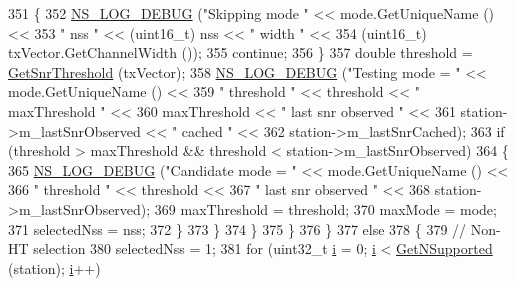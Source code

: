 \begin{DoxyCode}
351                         \{
352                           \hyperlink{group__logging_ga413f1886406d49f59a6a0a89b77b4d0a}{NS\_LOG\_DEBUG} (\textcolor{stringliteral}{"Skipping mode "} << mode.GetUniqueName () <<
353                                         \textcolor{stringliteral}{" nss "} << (uint16\_t) nss << \textcolor{stringliteral}{" width "} <<
354                                         (uint16\_t) txVector.GetChannelWidth ());
355                           \textcolor{keywordflow}{continue};
356                         \}
357                       \textcolor{keywordtype}{double} threshold = \hyperlink{classns3_1_1IdealWifiManager_a4712a1357ab7ba3f2aba5b183cd18f6a}{GetSnrThreshold} (txVector);
358                       \hyperlink{group__logging_ga413f1886406d49f59a6a0a89b77b4d0a}{NS\_LOG\_DEBUG} (\textcolor{stringliteral}{"Testing mode = "} << mode.GetUniqueName () <<
359                                     \textcolor{stringliteral}{" threshold "} << threshold  << \textcolor{stringliteral}{" maxThreshold "} <<
360                                     maxThreshold << \textcolor{stringliteral}{" last snr observed "} <<
361                                     station->m\_lastSnrObserved << \textcolor{stringliteral}{" cached "} <<
362                                     station->m\_lastSnrCached);
363                       \textcolor{keywordflow}{if} (threshold > maxThreshold && threshold < station->m\_lastSnrObserved)
364                         \{
365                           \hyperlink{group__logging_ga413f1886406d49f59a6a0a89b77b4d0a}{NS\_LOG\_DEBUG} (\textcolor{stringliteral}{"Candidate mode = "} << mode.GetUniqueName () <<
366                                         \textcolor{stringliteral}{" threshold "} << threshold  <<
367                                         \textcolor{stringliteral}{" last snr observed "} <<
368                                         station->m\_lastSnrObserved);
369                           maxThreshold = threshold;
370                           maxMode = mode;
371                           selectedNss = nss;
372                         \}
373                     \}
374                 \}
375             \}
376         \}
377       \textcolor{keywordflow}{else}
378         \{
379           \textcolor{comment}{// Non-HT selection}
380           selectedNss = 1;
381           \textcolor{keywordflow}{for} (uint32\_t \hyperlink{bernuolliDistribution_8m_a6f6ccfcf58b31cb6412107d9d5281426}{i} = 0; \hyperlink{bernuolliDistribution_8m_a6f6ccfcf58b31cb6412107d9d5281426}{i} < \hyperlink{classns3_1_1WifiRemoteStationManager_a7316bf091ebad5b8cd1a8b5ee47554d8}{GetNSupported} (station); \hyperlink{bernuolliDistribution_8m_a6f6ccfcf58b31cb6412107d9d5281426}{i}++)

\end{DoxyCode}
